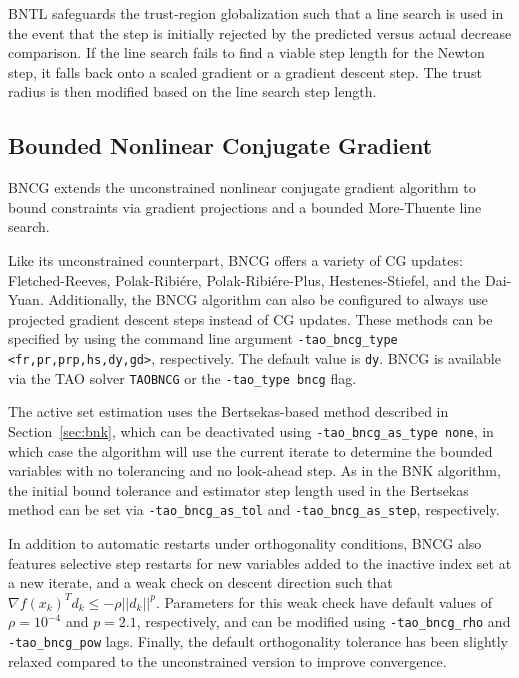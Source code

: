BNTL safeguards the trust-region globalization such that a line search is used in the event that 
the step is initially rejected by the predicted versus actual decrease comparison. If the line 
search fails to find a viable step length for the Newton step, it falls back onto a scaled gradient 
or a gradient descent step. The trust radius is then modified based on the line search step length.

\subsection{Bounded Nonlinear Conjugate Gradient}
\label{sec:bncg}

BNCG extends the unconstrained nonlinear conjugate gradient algorithm to 
bound constraints via gradient projections and a bounded More-Thuente line search. 

Like its unconstrained counterpart, BNCG offers a variety of CG updates: Fletched-Reeves, 
Polak-Ribi\'ere, Polak-Ribi\'ere-Plus, Hestenes-Stiefel, and the Dai-Yuan. Additionally, 
the BNCG algorithm can also be configured to always use projected gradient descent steps
instead of CG updates. These methods can be specified by using the command line argument 
{\tt -tao\_bncg\_type <fr,pr,prp,hs,dy,gd>}, respectively. The default value is {\tt dy}.
BNCG is available via the TAO solver {\tt TAOBNCG} or the {\tt -tao\_type bncg} flag.

The active set estimation uses the Bertsekas-based method described in Section~\ref{sec:bnk}, 
which can be deactivated using {\tt -tao\_bncg\_as\_type none}, in which case the 
algorithm will use the current iterate to determine the bounded variables with no tolerancing 
and no look-ahead step. As in the BNK algorithm, the initial bound tolerance and estimator 
step length used in the Bertsekas method can be set via {\tt -tao\_bncg\_as\_tol} and 
{\tt -tao\_bncg\_as\_step}, respectively.

In addition to automatic restarts under orthogonality conditions, BNCG also features 
selective step restarts for new variables added to the inactive index set at a new iterate, 
and a weak check on descent direction such that $\nabla f(x_k)^T d_k \leq -\rho||d_k||^p$. 
Parameters for this weak check have default values of $\rho = 10^{-4}$ and $p = 2.1$, 
respectively, and can be modified using {\tt -tao\_bncg\_rho} and {\tt -tao\_bncg\_pow} 
lags. Finally, the default orthogonality tolerance has been slightly relaxed compared to 
the unconstrained version to improve convergence.

